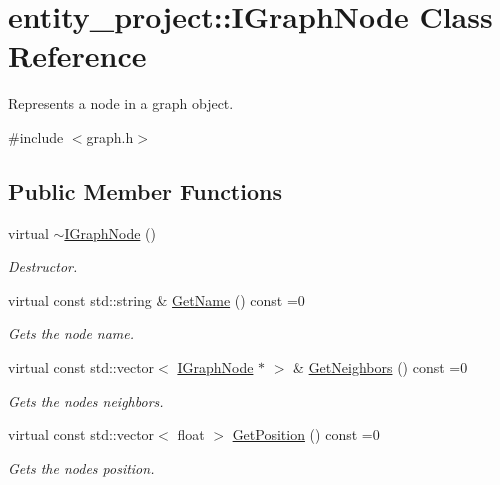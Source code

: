 \hypertarget{classentity__project_1_1IGraphNode}{}\section{entity\+\_\+project\+:\+:I\+Graph\+Node Class Reference}
\label{classentity__project_1_1IGraphNode}


Represents a node in a graph object.  




{\ttfamily \#include $<$graph.\+h$>$}

\subsection*{Public Member Functions}
\begin{DoxyCompactItemize}
\item 
\mbox{\label{classentity__project_1_1IGraphNode_ab77a03adc593f292be5d2e55fdbbbfa0}} 
virtual \hyperlink{classentity__project_1_1IGraphNode_ab77a03adc593f292be5d2e55fdbbbfa0}{$\sim$\+I\+Graph\+Node} ()
\begin{DoxyCompactList}\small\item\em Destructor. \end{DoxyCompactList}\item 
\mbox{\label{classentity__project_1_1IGraphNode_a05cdf42e5c6a3040017a1c8f5acdd25c}} 
virtual const std\+::string \& \hyperlink{classentity__project_1_1IGraphNode_a05cdf42e5c6a3040017a1c8f5acdd25c}{Get\+Name} () const =0
\begin{DoxyCompactList}\small\item\em Gets the node name. \end{DoxyCompactList}\item 
\mbox{\label{classentity__project_1_1IGraphNode_a382babc90ffbef731485f9116d605204}} 
virtual const std\+::vector$<$ \hyperlink{classentity__project_1_1IGraphNode}{I\+Graph\+Node} $\ast$ $>$ \& \hyperlink{classentity__project_1_1IGraphNode_a382babc90ffbef731485f9116d605204}{Get\+Neighbors} () const =0
\begin{DoxyCompactList}\small\item\em Gets the node\textquotesingle{}s neighbors. \end{DoxyCompactList}\item 
\mbox{\label{classentity__project_1_1IGraphNode_ad95b25e4a3285c7ba36a6ecc9ad2df9f}} 
virtual const std\+::vector$<$ float $>$ \hyperlink{classentity__project_1_1IGraphNode_ad95b25e4a3285c7ba36a6ecc9ad2df9f}{Get\+Position} () const =0
\begin{DoxyCompactList}\small\item\em Gets the node\textquotesingle{}s position. \end{DoxyCompactList}\end{DoxyCompactItemize}


